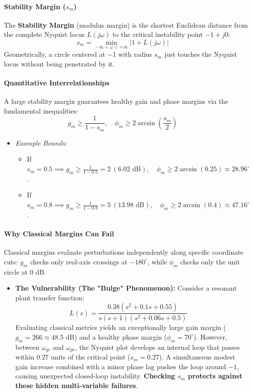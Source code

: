 \documentclass[12pt,onecolumn,twoside ]{article}
\begin{document}
	\paragraph{Stability Margin ($s_m$)}
	The \textbf{Stability Margin} (modulus margin) is the shortest Euclidean distance from the complete Nyquist locus $L(j\omega)$ to the critical instability point $-1 + j0$: \[
	s_m = \min_{-\infty < \omega < +\infty} |1 + L(j\omega)| \quad
	\] Geometrically, a circle centered at $-1$ with radius $s_m$ just touches the Nyquist locus without being penetrated by it.
	\paragraph{Quantitative Interrelationships}
	A large stability margin guarantees healthy gain and phase margins via the fundamental inequalities: \[
	g_m \ge \frac{1}{1 - s_m}, \quad \phi_m \ge 2 \arcsin\left(\frac{s_m}{2}\right) \quad
	\]
	\begin{itemize}
		\item
		\textit{Example Bounds:}
		\begin{itemize}
			\item
			If $s_m = 0.5 \implies g_m \ge \frac{1}{1 - 0.5} = 2 \ (6.02\text{ dB}), \quad \phi_m \ge 2\arcsin(0.25) \approx 28.96^\circ$.
			\item
			If $s_m = 0.8 \implies g_m \ge \frac{1}{1 - 0.8} = 5 \ (13.98\text{ dB}), \quad \phi_m \ge 2\arcsin(0.4) \approx 47.16^\circ$.
		\end{itemize}
	\end{itemize}
	\paragraph{Why Classical Margins Can Fail}
	Classical margins evaluate perturbations independently along specific coordinate cuts: $g_m$ checks only real-axis crossings at $-180^\circ$, while $\phi_m$ checks only the unit circle at $0\text{ dB}$.
	\begin{itemize}
		\item
		\textbf{The Vulnerability (The "Bulge" Phenomenon):} Consider a resonant plant transfer function: \[
		L(s) = \frac{0.38(s^2 + 0.1s + 0.55)}{s(s + 1)(s^2 + 0.06s + 0.5)} \quad
		\] Evaluating classical metrics yields an exceptionally large gain margin ($g_m = 266 \approx 48.5\text{ dB}$) and a healthy phase margin ($\phi_m = 70^\circ$). However, between $\omega_{gc}$ and $\omega_{pc}$, the Nyquist plot develops an internal loop that passes within $0.27$ units of the critical point ($s_m = 0.27$). A simultaneous modest gain increase combined with a minor phase lag pushes the loop around $-1$, causing unexpected closed-loop instability. \textbf{Checking $s_m$ protects against these hidden multi-variable failures}.
	\end{itemize}
	
\end{document}
